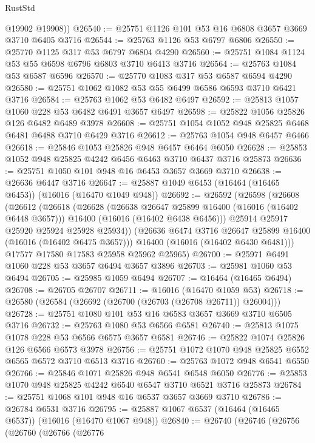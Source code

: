 \begin{lexlean}{RustStd}
\begin{coremodule}
        @19902
        @19908))
@26540 := @25751 @1126 @101 @53 @16 @6808 @3657 @3669 @3710 @6405 @3716
@26544 := @25763 @1126 @53 @6797 @6806
@26550 := @25770 @1125 @317 @53 @6797 @6804 @4290
@26560 := @25751 @1084 @1124 @53 @55 @6598 @6796 @6803 @3710 @6413 @3716
@26564 := @25763 @1084 @53 @6587 @6596
@26570 := @25770 @1083 @317 @53 @6587 @6594 @4290
@26580 := @25751 @1062 @1082 @53 @55 @6499 @6586 @6593 @3710 @6421 @3716
@26584 := @25763 @1062 @53 @6482 @6497
@26592 := @25813 @1057 @1060 @228 @53 @6482 @6491 @3657 @6497
@26598 := @25822 @1056 @25826 @126 @6482 @6489 @3978
@26608 := @25751 @1054 @1052 @948 @25825 @6468 @6481 @6488 @3710 @6429 @3716
@26612 := @25763 @1054 @948 @6457 @6466
@26618 := @25846 @1053 @25826 @948 @6457 @6464 @6050
@26628 := @25853 @1052 @948 @25825 @4242 @6456 @6463 @3710 @6437 @3716 @25873
@26636 := @25751 @1050 @101 @948 @16 @6453 @3657 @3669 @3710
@26638 := @26636 @6447 @3716
@26647 := @25887 @1049 @6453 (@16464 (@16465 @6453)) (@16016 (@16470 @1049 @948))
@26692 := @26592
    (@26598
      (@26608
        (@26612
          (@26618
            (@26628
              (@26638 @26647 @25899 @16400 (@16016 (@16402 @6448 @3657)))
              @16400
              (@16016 (@16402 @6438 @6456)))
            @25914
            @25917
            @25920
            @25924
            @25928
            @25934))
        (@26636 @6474 @3716 @26647 @25899 @16400 (@16016 (@16402 @6475 @3657)))
        @16400
        (@16016 (@16402 @6430 @6481)))
      @17577
      @17580
      @17583
      @25958
      @25962
      @25965)
@26700 := @25971 @6491 @1060 @228 @53 @3657 @6494 @3657 @3896
@26703 := @25981 @1060 @53 @6494
@26705 := @25985 @1059 @6494
@26707 := @16464 (@16465 @6494)
@26708 := @26705 @26707
@26711 := @16016 (@16470 @1059 @53)
@26718 := @26580 (@26584 (@26692 (@26700 (@26703 (@26708 @26711)) @26004)))
@26728 := @25751 @1080 @101 @53 @16 @6583 @3657 @3669 @3710 @6505 @3716
@26732 := @25763 @1080 @53 @6566 @6581
@26740 := @25813 @1075 @1078 @228 @53 @6566 @6575 @3657 @6581
@26746 := @25822 @1074 @25826 @126 @6566 @6573 @3978
@26756 := @25751 @1072 @1070 @948 @25825 @6552 @6565 @6572 @3710 @6513 @3716
@26760 := @25763 @1072 @948 @6541 @6550
@26766 := @25846 @1071 @25826 @948 @6541 @6548 @6050
@26776 := @25853 @1070 @948 @25825 @4242 @6540 @6547 @3710 @6521 @3716 @25873
@26784 := @25751 @1068 @101 @948 @16 @6537 @3657 @3669 @3710
@26786 := @26784 @6531 @3716
@26795 := @25887 @1067 @6537 (@16464 (@16465 @6537)) (@16016 (@16470 @1067 @948))
@26840 := @26740
    (@26746
      (@26756
        (@26760
          (@26766
            (@26776

\end{coremodule}
\end{lexlean}
